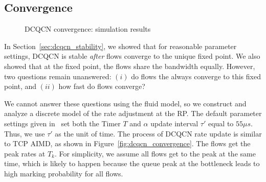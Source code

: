 \subsection{Convergence}
\label{sec:dcqcn_convergence}


\begin{figure}[t]
\center
{}
\caption{DCQCN convergence: simulation results}
\label{fig:dcqcn_convergence_sim}
\end{figure}

In Section~\ref{sec:dcqcn_stability}, we showed that for reasonable parameter
settings,  DCQCN is stable {\em after} flows converge to the unique fixed point.
We also showed that at the fixed point, the flows share the bandwidth equally.
However, two questions remain unanswered: $(i)$ do flows the always converge
to this fixed point, and $(ii)$ how fast do flows converge? 

We cannot answer these questions using the fluid model, so we construct and
analyze a discrete model of the rate adjustment at the RP. The default parameter
settings given in~\cite{dcqcn} set both the Timer $T$ and $\alpha$ update
interval $\tau '$ equal to $55\mu s$. Thus, we use $\tau '$ as the unit of time.
The process of DCQCN rate update is similar to TCP AIMD, as shown in
Figure~\ref{fig:dcqcn_convergence}.  The flows get the peak rates at $T_k$. For
simplicity, we assume all flows get to the peak at the same time, which is
likely to happen because the queue peak at the bottleneck leads to high marking
probability for all flows. 

